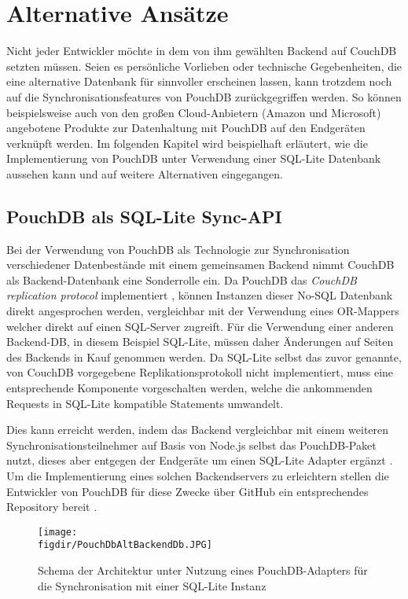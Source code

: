 \chapter{Alternative Ansätze}
\label{Alternative Ansätze}

Nicht jeder Entwickler möchte in dem von ihm gewählten Backend auf CouchDB setzten müssen. Seien es persönliche Vorlieben oder technische Gegebenheiten, die eine alternative Datenbank für sinnvoller erscheinen lassen, kann trotzdem noch auf die Synchronisationsfeatures von PouchDB zurückgegriffen werden. So können beispielsweise auch von den großen Cloud-Anbietern (Amazon und Microsoft) angebotene Produkte zur Datenhaltung mit PouchDB auf den Endgeräten verknüpft werden. Im folgenden Kapitel wird beispielhaft erläutert, wie die Implementierung von PouchDB unter Verwendung einer SQL-Lite Datenbank aussehen kann und auf weitere Alternativen eingegangen.

\section{PouchDB als SQL-Lite Sync-API}
Bei der Verwendung von PouchDB als Technologie zur Synchronisation verschiedener Datenbestände mit einem gemeinsamen Backend nimmt CouchDB als Backend-Datenbank eine Sonderrolle ein. Da PouchDB das \emph{CouchDB replication protocol} implementiert \cite{pouch:syncnoncouchdb}, können Instanzen dieser No-SQL Datenbank direkt angesprochen werden, vergleichbar mit der Verwendung eines OR-Mappers welcher direkt auf einen SQL-Server zugreift. Für die Verwendung einer anderen Backend-DB, in diesem Beispiel SQL-Lite, müssen daher Änderungen auf Seiten des Backends in Kauf genommen werden. Da SQL-Lite selbst das zuvor genannte, von CouchDB vorgegebene Replikationsprotokoll nicht implementiert, muss eine entsprechende Komponente vorgeschalten werden, welche die ankommenden Requests in SQL-Lite kompatible Statements umwandelt.

Dies kann erreicht werden, indem das Backend vergleichbar mit einem weiteren Synchronisationsteilnehmer auf Basis von Node.js selbst das PouchDB-Paket nutzt, dieses aber entgegen der Endgeräte um einen SQL-Lite Adapter ergänzt \cite{pouch:sqlliteplugin}. Um die Implementierung eines solchen Backendservers zu erleichtern stellen die Entwickler von PouchDB für diese Zwecke über GitHub ein entsprechendes Repository bereit \cite{pouch:pouchdbserver}.

\begin{figure}[htb]
	\centering
	\caption{Schema der Architektur unter Nutzung eines PouchDB-Adapters für die Synchronisation mit einer SQL-Lite Instanz}
	\label{fig:pouchdbadapter}
	\texttt{[image: \\figdir/PouchDbAltBackendDb.JPG]}
\end{figure}

